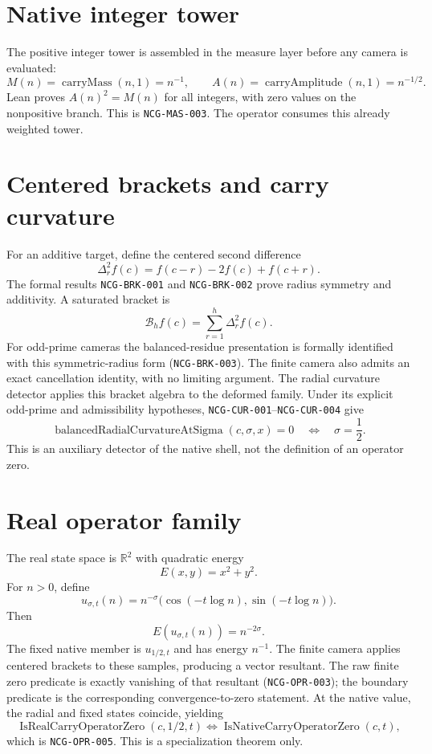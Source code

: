\documentclass[11pt,a4paper]{article}
\newcommand{\R}{\mathbb{R}}
\begin{document}
\section{Native integer tower}
The positive integer tower is assembled in the measure layer before any camera is evaluated:
\[ M(n)=\operatorname{carryMass}(n,1)=n^{-1},\qquad A(n)=\operatorname{carryAmplitude}(n,1)=n^{-1/2}. \]
Lean proves $A(n)^2=M(n)$ for all integers, with zero values on the nonpositive branch. This is \texttt{NCG-MAS-003}. The operator consumes this already weighted tower.
\section{Centered brackets and carry curvature}
For an additive target, define the centered second difference
\[ \Delta_r^2f(c)=f(c-r)-2f(c)+f(c+r). \]
The formal results \texttt{NCG-BRK-001} and \texttt{NCG-BRK-002} prove radius symmetry and additivity. A saturated bracket is
\[ \mathcal B_hf(c)=\sum_{r=1}^{h}\Delta_r^2f(c). \]
For odd-prime cameras the balanced-residue presentation is formally identified with this symmetric-radius form (\texttt{NCG-BRK-003}). The finite camera also admits an exact cancellation identity, with no limiting argument.
The radial curvature detector applies this bracket algebra to the deformed family. Under its explicit odd-prime and admissibility hypotheses, \texttt{NCG-CUR-001}--\texttt{NCG-CUR-004} give
\[ \operatorname{balancedRadialCurvatureAtSigma}(c,\sigma,x)=0 \quad\Longleftrightarrow\quad \sigma=\frac12. \]
This is an auxiliary detector of the native shell, not the definition of an operator zero.
\section{Real operator family}
The real state space is $\R^2$ with quadratic energy
\[ E(x,y)=x^2+y^2. \]
For $n>0$, define
\[ u_{\sigma,t}(n)=n^{-\sigma}\bigl(\cos(-t\log n),\sin(-t\log n)\bigr). \]
Then
\[ E(u_{\sigma,t}(n))=n^{-2\sigma}. \]
The fixed native member is $u_{1/2,t}$ and has energy $n^{-1}$. The finite camera applies centered brackets to these samples, producing a vector resultant. The raw finite zero predicate is exactly vanishing of that resultant (\texttt{NCG-OPR-003}); the boundary predicate is the corresponding convergence-to-zero statement.
At the native value, the radial and fixed states coincide, yielding
\[ \operatorname{IsRealCarryOperatorZero}(c,1/2,t)\Longleftrightarrow \operatorname{IsNativeCarryOperatorZero}(c,t), \]
which is \texttt{NCG-OPR-005}. This is a specialization theorem only.
\end{document}
